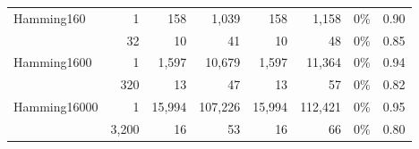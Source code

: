 \begin{table}
{\begin{tabular}{l||r||rr||rr||rr}
\multirow{2}{*}{Hamming160}   & 1                                        & 158                                                                    & 1,039                                                                      & 158                                                                    & 1,158                                                                      & 0\%                     & 0.90                    \\
                              & 32                                       & 10                                                                     & 41                                                                         & 10                                                                     & 48                                                                         & 0\%                     & 0.85                    \\ \hline
\multirow{2}{*}{Hamming1600}  & 1                                        & 1,597                                                                  & 10,679                                                                     & 1,597                                                                  & 11,364                                                                     & 0\%                     & 0.94                    \\
                              & 320                                      & 13                                                                     & 47                                                                         & 13                                                                     & 57                                                                         & 0\%                     & 0.82                    \\ \hline
\multirow{2}{*}{Hamming16000} & 1                                        & 15,994                                                                 & 107,226                                                                    & 15,994                                                                 & 112,421                                                                    & 0\%                     & 0.95                    \\
                              & 3,200                                    & 16                                                                     & 53                                                                         & 16                                                                     & 66                                                                         & 0\%                     & 0.80                    \\ \hline \hline

\end{tabular}}
\end{table}
